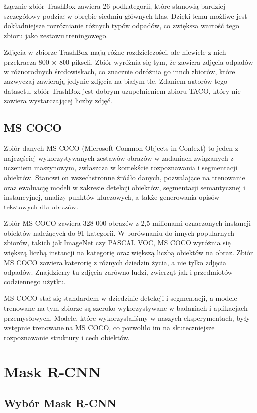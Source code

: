 \documentclass[licencjacka]{pracamgr}
\begin{document}
Łącznie zbiór TrashBox zawiera 26 podkategorii, które stanowią bardziej szczegółowy podział w obrębie siedmiu głównych klas. Dzięki temu możliwe jest dokładniejsze rozróżnianie różnych typów odpadów, co zwiększa wartość tego zbioru jako zestawu treningowego.   

Zdjęcia w zbiorze TrashBox mają różne rozdzielczości, ale niewiele z nich przekracza 800 × 800 pikseli. Zbiór wyróżnia się tym, że zawiera zdjęcia odpadów w różnorodnych środowiskach, co znacznie odróżnia go innch zbiorów, które zazwyczaj zawierają jedynie zdjęcia na białym tle. Zdaniem autorów tego datasetu, zbiór TrashBox jest dobrym uzupełnieniem zbioru TACO, który nie zawiera wystarczającej liczby zdjęć.

\section{MS COCO}

Zbiór danych MS COCO (Microsoft Common Objects in Context) to jeden z najczęściej wykorzystywanych zestawów obrazów w zadaniach związanych z uczeniem maszynowym, zwłaszcza w kontekście rozpoznawania i segmentacji obiektów. Stanowi on wszechstronne źródło danych, pozwalające na trenowanie oraz ewaluację modeli w zakresie detekcji obiektów, segmentacji semantycznej i instancyjnej, analizy punktów kluczowych, a także generowania opisów tekstowych dla obrazów.  

Zbiór MS COCO zawiera 328 000 obrazów z 2,5 milionami oznaczonych instancji obiektów należących do 91 kategorii. W porównaniu do innych popularnych zbiorów, takich jak ImageNet czy PASCAL VOC, MS COCO wyróżnia się większą liczbą instancji na kategorię oraz większą liczbą obiektów na obraz. Zbiór MS COCO zawiera katerorię z różnych dziedzin życia, a nie tylko zdjęcia odpadów. Znajdziemy tu zdjęcia zarówno ludzi, zwierząt jak i przedmiotów codziennego użytku.

MS COCO stał się standardem w dziedzinie detekcji i segmentacji, a modele trenowane na tym zbiorze są szeroko wykorzystywane w badaniach i aplikacjach przemysłowych. Modele, które wykorzystaliśmy w naszych eksperymentach, były wstępnie trenowane na MS COCO, co pozwoliło im na skuteczniejsze rozpoznawanie struktury i cech obiektów.  

\chapter{Mask R-CNN}\label{MASKRCNN}

\section{Wybór Mask R-CNN}
\end{document}
